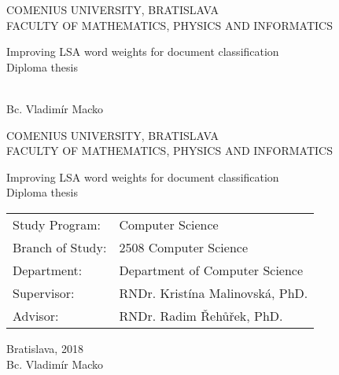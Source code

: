 \documentclass[12pt, oneside]{book}
\theoremstyle{definition}
\def\mfrok{2018}
\def\mfnazov{Improving LSA word weights for document classification}
\def\mftyp{Diploma thesis}
\def\mfautor{Bc. Vladimír Macko}
\def\mfskolitel{RNDr. Kristína Malinovská, PhD.}
\def\mfkonzultant{RNDr. Radim Řehůřek, PhD.}
\def\mfmiesto{Bratislava, \mfrok}
\def\mfodbor{ 2508 Computer Science }
\def\program{ Computer Science }
\def\mfpracovisko{ Department of Computer Science }
\begin{document}
     

\thispagestyle{empty}

\begin{center}
\sc\large
COMENIUS UNIVERSITY, BRATISLAVA\\
FACULTY OF MATHEMATICS, PHYSICS AND INFORMATICS

\vfill

{\LARGE\mfnazov}\\
\mftyp
\end{center}

\vfill

{\sc\large 
\noindent \mfrok\\
\mfautor
}

\eject %


\thispagestyle{empty}
\noindent

\begin{center}
\sc  
\large
COMENIUS UNIVERSITY, BRATISLAVA\\
FACULTY OF MATHEMATICS, PHYSICS AND INFORMATICS

\vfill

{\LARGE\mfnazov}\\
\mftyp
\end{center}

\vfill

\noindent
\begin{tabular}{ll}
Study Program: & \program \\
Branch of Study: & \mfodbor \\
Department: & \mfpracovisko \\
Supervisor: & \mfskolitel \\
Advisor: & \mfkonzultant \\
\end{tabular}

\vfill


\noindent \mfmiesto\\
\mfautor

\eject %





\newpage 
\thispagestyle{empty}
%
\end{document}
